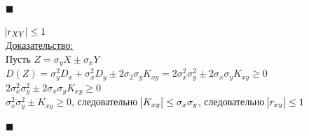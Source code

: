\documentclass[russian, 12pt, fleqn,x11names]{article}
\begin{document}
\begin{flushright}\(\blacksquare\)\end{flushright}
$\abs{r_{XY}} \leq 1$\\
\underline{Доказательство:}\\	
Пусть $Z = \sigma_y X \pm \sigma_xY$\\
$D(Z) = \sigma_y^2 D_x + \sigma_x^2D_y \pm 2\sigma_2 \sigma_y K_{xy} = 2 \sigma_x^2 \sigma_y^2 \pm  2 \sigma_x \sigma_y K_{xy} \geq 0$\\
 $2\sigma_x^2 \sigma_y^2 \pm  2 \sigma_x \sigma_y K_{xy} \geq 0$\\
 $\sigma_x^2 \sigma_y^2 \pm  K_{xy} \geq 0$, следовательно $\abs{K_{xy}} \leq \sigma_x \sigma_y$, следовательно $\abs{r_{xy}} \leq 1$\\
\begin{flushright}\(\blacksquare\)\end{flushright}
\end{document}

